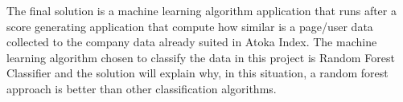 The final solution is a machine learning algorithm application that runs after a score generating application that compute how similar is a page/user data collected to the company data already suited in Atoka Index. The machine learning algorithm chosen to classify the data in this project is Random Forest Classifier and the solution will explain why, in this situation, a random forest approach is better than other classification algorithms.

